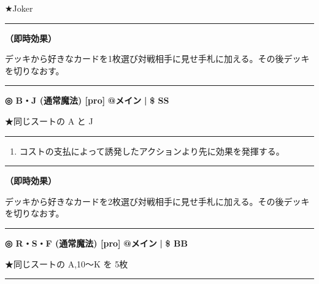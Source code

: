 \documentclass[twocolumn,a5paper,papersize,10pt]{jarticle}
\begin{document}
★Joker

\vspace{1mm}%
\hrule height 0.1mm depth 0mm width 66.5mm %
\vspace{1mm}%

{\bf（即時効果）}

デッキから好きなカードを1枚選び対戦相手に見せ手札に加える。その後デッキを切りなおす。
\vspace{2mm} %
\hrule height 0.5mm depth 0mm width 66.5mm %
\vspace{1mm} %
{\normalsize\bf ◎ B・J {\scriptsize (通常魔法) [pro]}} %
\hfill 
{\small\bf @メイン }
  {\small\bf | } {\small\bf \$ SS}

★同じスートの A と J

\vspace{1mm}%
\hrule height 0.1mm depth 0mm width 66.5mm %
\vspace{1mm}%


\vspace{-1zh}%
\begin{enumerate}
\renewcommand{\labelenumi}{※}
\setlength{\leftskip}{-0.3cm}
\setlength{\itemsep}{0pt} %
\setlength{\parskip}{0pt} %

\item コストの支払によって誘発したアクションより先に効果を発揮する。

\vspace{-3mm}%
\end{enumerate}
\vspace{1mm}%
\hrule height 0.1mm depth 0mm width 66.5mm %
\vspace{1mm}%

{\bf（即時効果）}

デッキから好きなカードを2枚選び対戦相手に見せ手札に加える。その後デッキを切りなおす。
\vspace{2mm} %
\hrule height 0.5mm depth 0mm width 66.5mm %
\vspace{1mm} %
{\normalsize\bf ◎ R・S・F {\scriptsize (通常魔法) [pro]}} %
\hfill 
{\small\bf @メイン }
  {\small\bf | } {\small\bf \$ BB}

★同じスートの A,10〜K を 5枚

\vspace{1mm}%
\hrule height 0.1mm depth 0mm width 66.5mm %
\vspace{1mm}%
\end{document}

